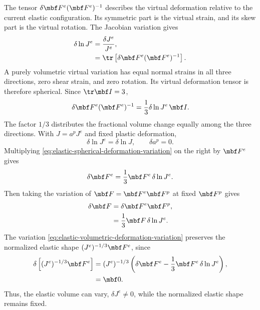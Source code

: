 The tensor \(\delta\mbf F^e(\mbf F^e)^{-1}\) describes the virtual
deformation relative to the current elastic configuration.  Its symmetric
part is the virtual strain, and its skew part is the virtual rotation.  The
Jacobian variation gives
\begin{align}
 \delta\ln J^e&=\frac{\delta J^e}{J^e},
 \notag
\\
 &=\tr\left[\delta\mbf F^e(\mbf F^e)^{-1}\right].
 \label{eq:elastic-volume-variation-trace}
\end{align}
A purely volumetric virtual variation has equal normal strains in all three
directions, zero shear strain, and zero rotation.  Its virtual
deformation tensor is therefore spherical.  Since \(\tr\mbf I=3\),
\begin{equation}
 \delta\mbf F^e(\mbf F^e)^{-1}
 =\frac13\delta\ln J^e\,\mbf I.
 \label{eq:elastic-spherical-deformation-variation}
\end{equation}
The factor \(1/3\) distributes the fractional volume change equally among
the three directions.  With \(J=a^pJ^e\) and fixed plastic deformation,
\begin{equation*}
 \delta\ln J^e=\delta\ln J,
 \qquad \delta a^p=0.
\end{equation*}
Multiplying \eqref{eq:elastic-spherical-deformation-variation} on the
right by \(\mbf F^e\) gives
\begin{equation}
 \delta\mbf F^e=\frac13\mbf F^e\,\delta\ln J^e.
 \label{eq:elastic-volumetric-deformation-variation}
\end{equation}
Then taking the variation of \(\mbf F=\mbf F^e\mbf F^p\) at fixed
\(\mbf F^p\) gives
\begin{align}
 \delta\mbf F&=\delta\mbf F^e\mbf F^p,
 \notag
\\
 &=\frac13\mbf F\,\delta\ln J^e.
 \label{eq:total-volumetric-deformation-variation}
\end{align}
The variation \eqref{eq:elastic-volumetric-deformation-variation}
preserves the normalized elastic shape \((J^e)^{-1/3}\mbf F^e\), since
\begin{align}
 \delta\left[(J^e)^{-1/3}\mbf F^e\right]
 &=(J^e)^{-1/3}\left(\delta\mbf F^e
 -\frac13\mbf F^e\,\delta\ln J^e\right),
 \label{eq:elastic-shape-variation-expansion}\\
 &=\mbf0.
 \notag
\end{align}
Thus, the elastic volume can vary, \(\delta J^e\ne0\), while the normalized
elastic shape remains fixed.

